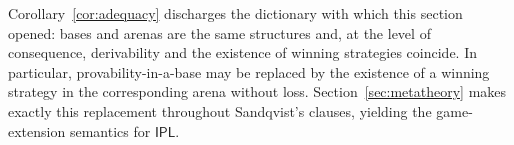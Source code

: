 \documentclass{lipics-v2021}
\newcommand{\wstrat}[1]{\blacktriangleright_{#1}}            %
\newcommand{\arena}[1]{\mathbb{#1}}                     %
\newcommand{\At}{\mathit{At}}                           %
\newcommand{\IPL}{\textsf{IPL}}
\begin{document}
Corollary~\ref{cor:adequacy} discharges the dictionary with which this
section opened: bases and arenas are the same structures and, at the level
of consequence, derivability and the existence of winning strategies
coincide. In particular, provability-in-a-base may be replaced by the
existence of a winning strategy in the corresponding arena without loss.
Section~\ref{sec:metatheory} makes exactly this replacement throughout Sandqvist's
clauses, yielding the game-extension semantics for $\IPL$.
\end{document}
